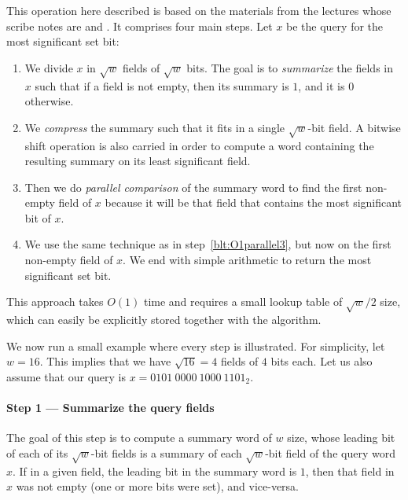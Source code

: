 This operation here described is based on the materials from the lectures whose scribe notes are \cite{nelsonjelanilec2} and \cite{erikdemainelec12}.
It comprises four main steps.
Let $x$ be the query for the most significant set bit:
\begin{enumerate}
    \item
    We divide $x$ in $\sqrt{w}$ fields of $\sqrt{w}$ bits. The goal is to \textit{summarize} the fields in $x$ such that if a field is not empty, then its summary is $1$, and it is $0$ otherwise.
    
    \item
    We \textit{compress} the summary such that it fits in a single $\sqrt{w}$-bit field. A bitwise shift operation is also carried in order to compute a word containing the resulting summary on its least significant field.
    
    \item \label{blt:O1parallel3}
    Then we do \textit{parallel comparison} of the summary word to find the first non-empty field of $x$ because it will be that field that contains the most significant bit of $x$.
    
    \item
    We use the same technique as in step~\ref{blt:O1parallel3}, but now on the first non-empty field of $x$. We end with simple arithmetic to return the most significant set bit. 
\end{enumerate}

This approach takes $O(1)$ time and requires a small lookup table of $\sqrt{w}/2$ size, which can easily be explicitly stored together with the algorithm.

We now run a small example where every step is illustrated. For simplicity, let $w=16$. This implies that we have $\sqrt{16} = 4$ fields of $4$ bits each. Let us also assume that our query is $x = 0101\ 0000\ 1000\ 1101_2$.

\paragraph{Step 1 --- Summarize the query fields} \label{sec:summaryfields}

The goal of this step is to compute a summary word of $w$ size, whose leading bit of each of its $\sqrt{w}$-bit fields is a summary of each $\sqrt{w}$-bit field of the query word $x$. If in a given field, the leading bit in the summary word is $1$, then that field in $x$ was not empty (one or more bits were set), and vice-versa.

